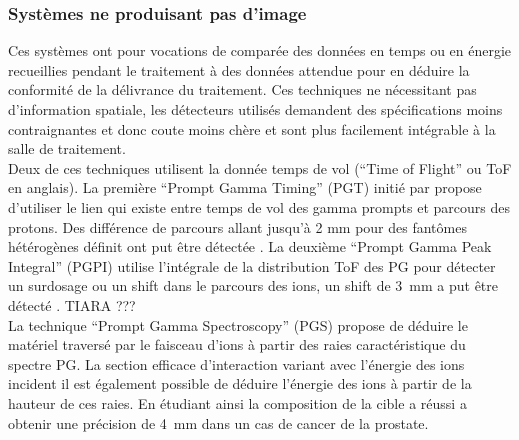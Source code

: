 \documentclass[11pt,a4paper,oldfontcommands]{memoir}
\begin{document}
\subsubsection{Systèmes ne produisant pas d'image}
Ces systèmes ont pour vocations de comparée des données en temps ou en énergie recueillies pendant le traitement à des données attendue pour en déduire la conformité de la délivrance du traitement. Ces techniques ne nécessitant pas d'information spatiale, les détecteurs utilisés demandent des spécifications moins contraignantes et donc coute moins chère et sont plus facilement intégrable à la salle de traitement.\\
Deux de ces techniques utilisent la donnée temps de vol (\enquote{Time of Flight} ou ToF en anglais). La première \enquote{Prompt Gamma Timing} (PGT) initié par \cite{Golnik_2014} propose d'utiliser le lien qui existe entre temps de vol des gamma prompts et parcours des protons. Des différence de parcours allant jusqu'à 2 mm pour des fantômes hétérogènes définit ont put être détectée \cite{Hueso_Gonz_lez_2015}. La deuxième \enquote{Prompt Gamma Peak Integral} (PGPI) utilise l'intégrale de la distribution ToF des PG pour détecter un surdosage ou un shift dans le parcours des ions, un shift de 3~mm a put être détecté \cite{KrimmerPGPI}. TIARA ???\\
La technique \enquote{Prompt Gamma Spectroscopy} (PGS) propose de déduire le matériel traversé par le faisceau d'ions à partir des raies caractéristique du spectre PG. La section efficace d'interaction variant avec l'énergie des ions incident il est également possible de déduire l'énergie des ions  à partir de la hauteur de ces raies. En étudiant ainsi la composition de la cible \cite{Testa_2014} a réussi a obtenir une précision de 4~mm dans un cas de cancer de la prostate.
\end{document}
